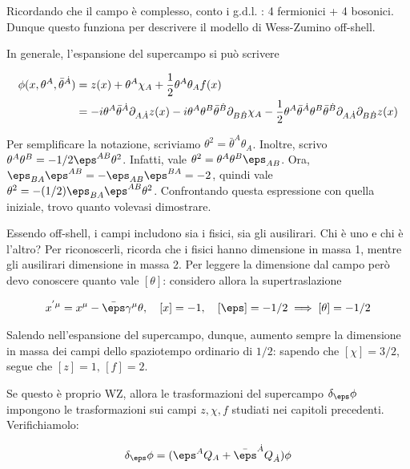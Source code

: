 \documentclass{report}
\begin{document}
Ricordando che il campo è complesso, conto i g.d.l. : 4 fermionici + 4 bosonici. Dunque questo funziona per descrivere il modello di Wess-Zumino off-shell.  

In generale, l'espansione del supercampo si può scrivere 

\begin{align}
    \phi(x, \theta^A, \bar{\theta}^{\dot{A}}) &= z(x) + \theta^A \chi_A + \frac{1}{2}\theta^A \theta_A f(x) \notag \\
    &= -i\theta^A \bar{\theta}^{\dot{A}}\partial_{A\dot{A}}z(x) - i\theta^A \theta^B \bar{\theta}^{\dot{B}}\partial_{B\dot{B}}\chi_A - \frac{1}{2}\theta^A \bar{\theta}^{\dot{A}}\theta^B \bar{\theta}^{\dot{B}}\partial_{A\dot{A}}\partial_{B\dot{B}}z(x)
\end{align}

Per semplificare la notazione, scriviamo \(\theta^2 = \bar{\theta}^A\theta_A\). Inoltre, scrivo \(\theta^A \theta^B = -1/2\eps^{AB}\theta^2\). Infatti, vale \(\theta^2 = \theta^A \theta^B \eps_{AB}\). Ora, \(\eps_{BA}\eps^{AB} = -\eps_{AB}\eps^{BA} = -2\), quindi vale \(\theta^2 = -(1/2)\eps_{BA}\eps^{AB}\theta^2\). Confrontando questa espressione con quella iniziale, trovo quanto volevasi dimostrare.  

Essendo off-shell, i campi includono sia i fisici, sia gli ausilirari. Chi è uno e chi è l'altro? Per riconoscerli, ricorda che i fisici hanno dimensione in massa 1, mentre gli ausilirari dimensione in massa 2. Per leggere la dimensione dal campo però devo conoscere quanto vale \([\theta]\): considero allora la supertraslazione 

\begin{align}
    x^{'\mu} = x^\mu - \bar{\eps}\gamma^\mu \theta, \quad [x] = -1, \quad [\eps] = -1/2 \implies  [\theta] = -1/2
\end{align}

Salendo nell'espansione del supercampo, dunque, aumento sempre la dimensione in massa dei campi dello spaziotempo ordinario di \(1/2\): sapendo che \([\chi] = 3/2\), segue che \([z] = 1, \, [f] = 2\). 

Se questo è proprio WZ, allora le trasformazioni del supercampo \(\delta_\eps \phi\) impongono le trasformazioni sui campi \(z, \chi, f\) studiati nei capitoli precedenti. Verifichiamolo: 

\begin{align}
    \delta_\eps \phi = (\eps^A Q_A + \bar{\eps}^{\dot{A}}Q_{\dot{A}})\phi 
\end{align}
\end{document}
